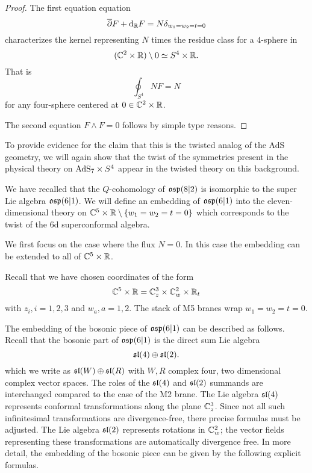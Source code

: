 \begin{proof}
The first equation equation 
\[
\overline{\partial} F + {\rm d}_{\mathbb R} F = N \delta_{w_1=w_2=t=0}
\]
characterizes the kernel representing $N$ times the residue class for a $4$-sphere in 
\[
(\mathbb C^2 \times \mathbb R) \setminus 0 \simeq S^4 \times \mathbb R .
\] 
That is
\[
\oint_{S^4} N F = N 
\]
for any four-sphere centered at $0 \in \mathbb C^2 \times \mathbb R$.

The second equation $F \wedge F = 0$ follows by simple type reasons. 
\end{proof}

\parsec[s:m5embedding]

To provide evidence for the claim that this is the twisted analog of the AdS geometry, we will again show that the twist of the symmetries present in the physical theory on ${\rm AdS}_7 \times S^4$ appear in the twisted theory on this background. 

We have recalled that the $Q$-cohomology of $\mathfrak{osp}(8|2)$ is isomorphic to the super Lie algebra $\mathfrak{osp}(6|1)$. 
We will define an embedding of $\mathfrak{osp}(6|1)$ into the eleven-dimensional theory on $\mathbb C^5 \times \mathbb R \setminus \{w_1=w_2=t=0\}$ which corresponds to the twist of the 6d superconformal algebra.

We first focus on the case where the flux $N=0$.
In this case the embedding can be extended to all of $\mathbb C^5 \times \mathbb R$. 



Recall that we have chosen coordinates of the form
\[
\mathbb C^5 \times \mathbb R = \mathbb C_z^3 \times \mathbb C_w^2 \times \mathbb R_t
\]
with $z_i, i=1,2,3$ and $w_a, a=1,2$.
The stack of M5 branes wrap $w_1=w_2=t=0$. 

The embedding of the bosonic piece of $\mathfrak{osp}(6|1)$ can be described as follows. Recall that the bosonic part of $\mathfrak{osp}(6|1)$ is the direct sum Lie algebra
\[
\mathfrak{sl}(4) \oplus \mathfrak{sl}(2) .
\]
which we write as $\mathfrak{sl}(W) \oplus \mathfrak{sl}(R)$ with $W,R$ complex four, two dimensional complex vector spaces. The roles of the $\mathfrak{sl}(4)$ and $\mathfrak{sl}(2)$ summands are interchanged compared to the case of the M2 brane. 
The Lie algebra $\mathfrak{sl}(4)$ represents conformal transformations along the plane $\mathbb C^3_z$.
Since not all such infinitesimal transformations are divergence-free, there precise formulas must be adjusted.   
The Lie algebra $\mathfrak{sl}(2)$ represents rotations in $\mathbb C^2_w$; the vector fields representing these transformations are automatically divergence free.
In more detail, the embedding of the bosonic piece can be given by the following explicit formulas. 

